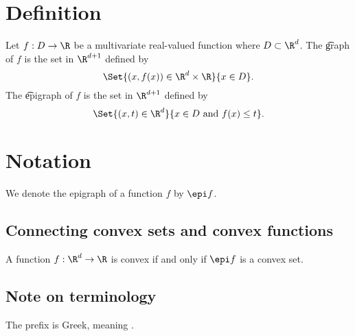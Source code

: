 
\section*{Definition}

Let $f: D \to \R $ be a multivariate real-valued function where $D \subset \R ^d$.
The \t{graph} of $f$ is the set in $\R ^{d + 1}$ defined by
  \[
\Set{(x, f(x)) \in \R ^d \times  \R }{x \in D}.
  \]
The \t{epigraph} of $f$ is the set in $\R ^{d + 1}$ defined by
  \[
\Set{(x, t) \in \R ^{d}}{x \in D \text{ and } f(x) \leq t}.
  \]

\section*{Notation}

We denote the epigraph of a function $f$ by $\epi f$.




\subsection*{Connecting convex sets and convex functions}

A function $f: \R ^d \to \R $ is convex if and only if $\epi f$ is a convex set.
\subsection*{Note on terminology}

The prefix  is Greek, meaning .

\blankpage
